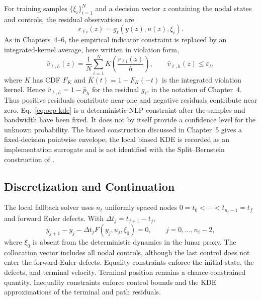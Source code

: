 For training samples $\{\xi_i\}_{i=1}^{N}$ and a decision vector $z$ containing the nodal states and controls, the residual observations are
\begin{equation}
 r_{\ell i}(z)=g_\ell(y(z),u(z),\xi_i).
\end{equation}
As in Chapters~4--6, the empirical indicator constraint is replaced by an integrated-kernel average, here written in violation form,
\begin{equation}
\hat v_{\ell,h}(z)=\frac{1}{N}\sum_{i=1}^{N}
 \overline K\!\left(\frac{r_{\ell i}(z)}{h}\right),
 \qquad \hat v_{\ell,h}(z)\leq\varepsilon_\ell,
 \label{eq:ocp-kde}
\end{equation}
where $K$ has CDF $F_K$ and $\overline K(t)=1-F_K(-t)$ is the integrated
violation kernel. Hence $\hat v_{\ell,h}=1-\hat p_h$ for the residual
$g_\ell$, in the notation of Chapter~4. Thus positive residuals contribute near
one and negative residuals contribute near zero. Eq.~\eqref{eq:ocp-kde} is a
deterministic NLP constraint after the samples and bandwidth have been fixed.
It does not by itself provide a confidence level for the unknown probability.
The biased construction discussed in Chapter~5 gives a fixed-decision
pointwise envelope; the local biased KDE is recorded as an
implementation surrogate and is not identified with the Split--Bernstein
construction of \citet{keil2020,keil2021}.

\subsection{Discretization and Continuation}

The local fallback solver uses $n_t$ uniformly spaced nodes $0=t_0<\cdots<t_{n_t-1}=t_f$ and forward Euler defects. With $\Delta t_j=t_{j+1}-t_j$,
\begin{equation}
 y_{j+1}-y_j-\Delta t_j F(y_j,u_j,\xi_0)=0,
 \qquad j=0,\ldots,n_t-2,
 \label{eq:euler-defect}
\end{equation}
where $\xi_0$ is absent from the deterministic dynamics in the lunar proxy. The collocation vector includes all nodal controls, although the last control does not enter the forward Euler defects. Equality constraints enforce the initial state, the defects, and terminal velocity. Terminal position remains a chance-constrained quantity. Inequality constraints enforce control bounds and the KDE approximations of the terminal and path residuals.

